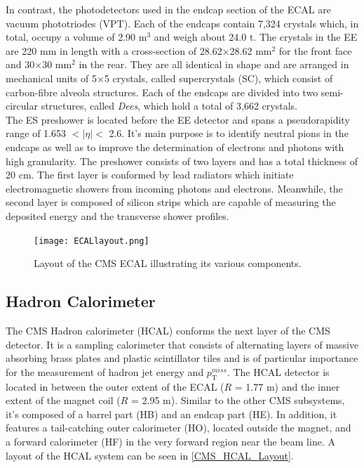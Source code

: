 In contrast, the photodetectors used in the endcap section of the ECAL are vacuum phototriodes (VPT)\cite{VPT}. Each of the endcaps contain 7,324 crystals which, in total, occupy a volume of 2.90 m$^3$ and weigh about 24.0 t. The crystals in the EE are 220 mm in length with a cross-section of 28.62$\times$28.62 mm$^2$ for the front face and 30$\times$30 mm$^2$ in the rear. They are all identical in shape and are arranged in mechanical units of 5$\times$5 crystals, called supercrystals (SC), which consist of carbon-fibre alveola structures. Each of the endcaps are divided into two semi-circular structures, called \textit{Dees}, which hold a total of 3,662 crystals. \\

The ES preshower is located before the EE detector and spans a pseudorapidity range of 1.653 $< |\eta| <$ 2.6. It's main purpose is to identify neutral pions in the endcaps as well as to improve the determination of electrons and photons with high granularity. The preshower consists of two layers and has a total thickness of 20 cm. The first layer is conformed by lead radiators which initiate electromagnetic showers from incoming photons and electrons. Meanwhile, the second layer is composed of silicon strips which are capable of measuring the deposited energy and the transverse shower profiles.

\begin{figure}[tb]
\begin{center}
\texttt{[image: ECALlayout.png]} 
\caption{Layout of the CMS ECAL illustrating its various components\cite{CMSdet1}.}
\label{CMS_ECAL_Layout}
\vspace{-1em}
\end{center}
\end{figure}

\subsection{Hadron Calorimeter}

The CMS Hadron calorimeter (HCAL) conforms the next layer of the CMS detector. It is a sampling calorimeter that consists of alternating layers of massive absorbing brass plates and plastic scintillator tiles and is of particular importance for the measurement of hadron jet energy and  $p_\text{T}^{miss}$. The HCAL detector is located in between the outer extent of the ECAL ($R$ = 1.77 m) and the inner extent of the magnet coil ($R$ = 2.95 m). Similar to the other CMS subsystems, it's composed of a barrel part (HB) and an endcap part (HE). In addition, it features a tail-catching outer calorimeter (HO), located outside the magnet, and a forward calorimeter (HF) in the very forward region near the beam line. A layout of the HCAL system can be seen in \autoref{CMS_HCAL_Layout}.\\

